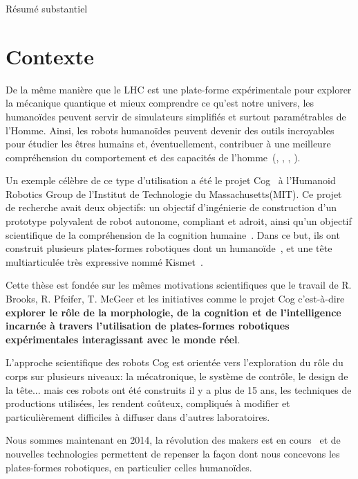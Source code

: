 
{Résumé substantiel}


\section*{Contexte} %

De la même manière que le LHC est une plate-forme expérimentale pour explorer la mécanique quantique et mieux comprendre ce qu’est notre univers, les humanoïdes peuvent servir de simulateurs simplifiés et surtout paramétrables de l'Homme. Ainsi, les robots humanoïdes peuvent devenir des outils incroyables pour étudier les êtres humains et, éventuellement, contribuer à une meilleure compréhension du comportement et des capacités de l’homme~(\cite{atkeson2000using}, \cite{cheng2007cb}, \cite{brooks1986achieving}, \cite{oudeyer2010impact}).

Un exemple célèbre de ce type  d’utilisation a été le projet Cog~\parencite{brooks1999cog} à l'Humanoid Robotics Group de l'Institut de Technologie du Massachusetts(MIT). Ce projet de recherche avait deux objectifs: un objectif d'ingénierie de construction d'un prototype polyvalent de robot autonome, compliant et adroit, ainsi qu’un objectif scientifique de la compréhension de la cognition humaine~\parencite{brooks1994building}. Dans ce but, ils ont construit plusieurs plates-formes robotiques dont un humanoïde~\parencite{brooks1999cog}, et une tête multiarticulée très expressive nommé Kismet~\parencite{breazeal2003emotion}.

Cette thèse est fondée sur les mêmes motivations scientifiques que le travail de R. Brooks, R. Pfeifer, T. McGeer et les initiatives comme le projet Cog c’est-à-dire \textbf{explorer le rôle de la morphologie, de la cognition et de l'intelligence incarnée à travers l'utilisation de plates-formes robotiques expérimentales interagissant avec le monde réel}.

L'approche scientifique des robots Cog est orientée vers l'exploration du rôle du corps sur plusieurs niveaux: la mécatronique, le système de contrôle, le design de la tête...  mais ces robots ont été construits il y a plus de 15 ans, les techniques de productions utilisées, les rendent coûteux, compliqués à modifier et particulièrement difficiles à diffuser dans d'autres laboratoires.

Nous sommes maintenant en 2014, la révolution des makers est en cours~\parencite{anderson2012makers} et de nouvelles technologies permettent de repenser la façon dont nous concevons les plates-formes robotiques, en particulier celles humanoïdes.


